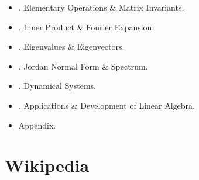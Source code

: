 \documentclass{article}
\newtheorem{problem}{Problem}
\begin{document}
\begin{itemize}
\begin{itemize}
\begin{problem}
\begin{verbatim}
				\left[\begin{matrix}-2 & -3 & 3\\4 & 4 & 2\end{matrix}\right] + \left[\begin{matrix}5 & 4 & 1\\3 & 3 & 3\end{matrix}\right] =
			\end{verbatim}
		\end{problem}
		\item {. Matrices \& Linear Mappings.} For a given linear mapping $f:V\to W$, impossible to thoroughly investigate ${\bf y}\in W$ satisfying ${\bf y} = f({\bf x})$, $\forall{\bf x}\in V$. (Even if $V$ is finite dimensional, it has an infinite number of vectors.) Convenient if can express relation ${\bf y} = f({\bf x})$ by a formula in ${\bf x}$ like $y = ax + b$ in case of usual numbers. Consider such a method.
		
		Let $V,W$ be linear spaces over $\mathbb{K}$ of dimensions $n,m$ \& let $X = \{{\bf v}_1,\ldots,{\bf v}_n\},Y = \{{\bf w}_1,\ldots,{\bf w}_m\}$ be their bases, resp. Because 
	\end{itemize}
	\item {. Elementary Operations \& Matrix Invariants.}
	\item {. Inner Product \& Fourier Expansion.}
	\item {. Eigenvalues \& Eigenvectors.}
	\item {. Jordan Normal Form \& Spectrum.}
	\item {. Dynamical Systems.}
	\item {. Applications \& Development of Linear Algebra.}
	\item {\sf Appendix.}
\end{itemize}


\section{Wikipedia}
\end{document}
